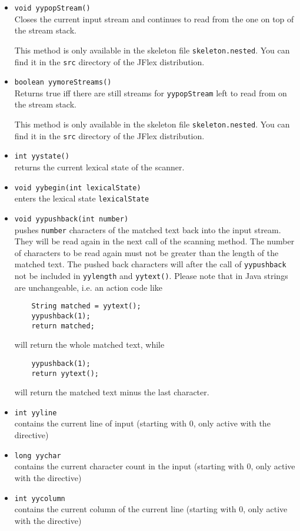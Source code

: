 \documentclass[11pt]{scrartcl}
\begin{document}
\begin{itemize}
\item \texttt{void yypopStream()}\\
  Closes the current input stream and continues to
  read from the one on top of the stream stack.

  This method is only available in the skeleton file
  \texttt{skeleton.nested}. You can find it in the 
  \texttt{src} directory of the JFlex distribution.

\item \texttt{boolean yymoreStreams()}\\
  Returns true iff there are still streams for \texttt{yypopStream} 
  left to read from on the stream stack.

  This method is only available in the skeleton file
  \texttt{skeleton.nested}. You can find it in the 
  \texttt{src} directory of the JFlex distribution. 

\item \texttt{int yystate()}\\
  returns the current lexical state of the scanner.

\item \texttt{void yybegin(int lexicalState)}\\
  enters the lexical state \texttt{lexicalState}

\item \texttt{void yypushback(int number)}\\
  pushes \texttt{number} characters of the matched text back into the input stream. 
  They will be read again in the next call of the scanning method. 
  The number of characters to be read again must not be greater than the length
  of the matched text. The pushed back characters will after the call of 
  \texttt{yypushback} not be included in \texttt{yylength} and \texttt{yytext()}.
  Please note that in Java strings are unchangeable, i.e. an action code like
  \begin{verbatim}
    String matched = yytext();
    yypushback(1);
    return matched;
  \end{verbatim}
  will return the whole matched text, while    
  \begin{verbatim}
    yypushback(1);
    return yytext();
  \end{verbatim}
  will return the matched text minus the last character.

\item\texttt{int yyline}\\
  contains the current line of input (starting with 0, only active with
  the \texttt{} directive)

\item \texttt{long yychar}\\
  contains the current character count in the input (starting with 0,
  only active with the \texttt{} directive)

\item \texttt{int yycolumn}\\
  contains the current column of the current line (starting with 0, only
  active with the \texttt{} directive)

\end{itemize}
\end{document}
